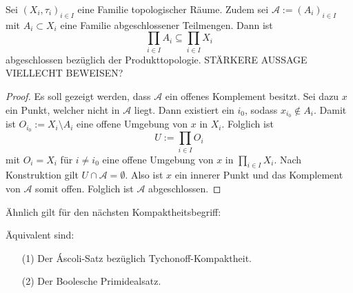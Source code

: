 \begin{prop}
  \label{prop:cartesianclosed}
  Sei $(X_i,\tau_i)_{i \in I}$ eine Familie topologischer Räume. 
  Zudem sei $\mathcal{A} := (A_i)_{i \in I}$ mit  $A_i \subset X_i$ eine Familie abgeschlossener Teilmengen.
  Dann ist 
  \begin{displaymath}
    \prod_{i \in I} A_i \subseteq \prod_{i \in I} X_i
  \end{displaymath}
  abgeschlossen bezüglich der Produkttopologie.
  STÄRKERE AUSSAGE VIELLECHT BEWEISEN?
\end{prop}

\begin{proof}
  Es soll gezeigt werden, dass $\mathcal{A}$ ein offenes Komplement besitzt.
  Sei dazu $x$ ein Punkt, welcher nicht in $\mathcal{A}$ liegt.
  Dann existiert ein $i_0$, sodass $x_{i_0} \not\in A_i$.
  Damit ist $O_{i_0} := X_i \setminus A_i$ eine offene Umgebung von $x$ in $X_i$.
  Folglich ist
  \begin{displaymath}
    U:= \prod_{i \in I} O_i
  \end{displaymath}
  mit $O_i = X_i$ für $i \not= i_0$ eine offene Umgebung von $x$ in $\prod_{i \in I} X_i$.
  Nach Konstruktion gilt $U \cap \mathcal{A} = \emptyset$.
  Also ist $x$ ein innerer Punkt und das Komplement von $\mathcal{A}$ somit offen.
  Folglich ist $\mathcal{A}$ abgeschlossen.
\end{proof}

Ähnlich gilt für den nächsten Kompaktheitsbegriff:

\begin{thm}
  Äquivalent sind:
  \begin{enumerate}
    \item[(1)] Der Áscoli-Satz bezüglich Tychonoff-Kompaktheit.
    \item[(2)] Der Boolesche Primidealsatz.
  \end{enumerate}
\end{thm}


